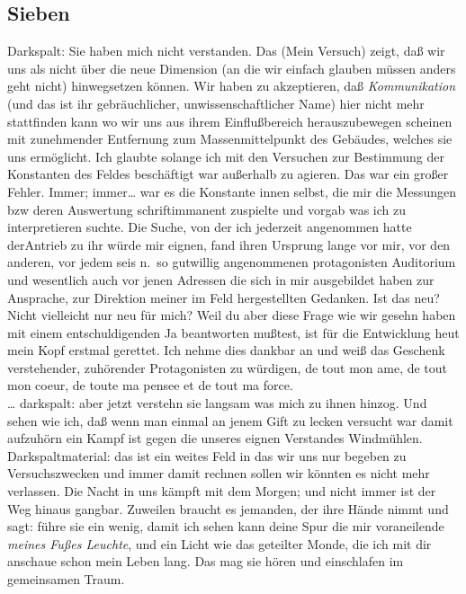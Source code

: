 \documentclass[
]{article}
\author{}
\date{\vspace{-2.5em}}
\begin{document}
\subsection{Sieben}\label{sieben}

Darkspalt: Sie haben mich nicht verstanden. Das (Mein Versuch) zeigt,
daß wir uns als nicht über die neue Dimension (an die wir einfach
glauben müssen anders geht nicht) hinwegsetzen können. Wir haben zu
akzeptieren, daß \emph{Kommunikation} (und das ist ihr gebräuchlicher,
unwissenschaftlicher Name) hier nicht mehr stattfinden kann wo wir uns
aus ihrem Einflußbereich herauszubewegen scheinen mit zunehmender
Entfernung zum Massenmittelpunkt des Gebäudes, welches sie uns
ermöglicht. Ich glaubte solange ich mit den Versuchen zur Bestimmung der
Konstanten des Feldes beschäftigt war außerhalb zu agieren. Das war ein
großer Fehler. Immer; immer\ldots{} war es die Konstante innen selbst,
die mir die Messungen bzw deren Auswertung schriftimmanent zuspielte und
vorgab was ich zu interpretieren suchte. Die Suche, von der ich
jederzeit angenommen hatte derAntrieb zu ihr würde mir eignen, fand
ihren Ursprung lange vor mir, vor den anderen, vor jedem seis n.~so
gutwillig angenommenen protagonisten Auditorium und wesentlich auch vor
jenen Adressen die sich in mir ausgebildet haben zur Ansprache, zur
Direktion meiner im Feld hergestellten Gedanken. Ist das neu? Nicht
vielleicht nur neu für mich? Weil du aber diese Frage wie wir gesehn
haben mit einem entschuldigenden Ja beantworten mußtest, ist für die
Entwicklung heut mein Kopf erstmal gerettet. Ich nehme dies dankbar an
und weiß das Geschenk verstehender, zuhörender Protagonisten zu
würdigen, de tout mon ame, de tout mon coeur, de toute ma pensee et de
tout ma force.\\
\ldots{} darkspalt: aber jetzt verstehn sie langsam was mich zu ihnen
hinzog. Und sehen wie ich, daß wenn man einmal an jenem Gift zu lecken
versucht war damit aufzuhörn ein Kampf ist gegen die unseres eignen
Verstandes Windmühlen. Darkspaltmaterial: das ist ein weites Feld in das
wir uns nur begeben zu Versuchszwecken und immer damit rechnen sollen
wir könnten es nicht mehr verlassen. Die Nacht in uns kämpft mit dem
Morgen; und nicht immer ist der Weg hinaus gangbar. Zuweilen braucht es
jemanden, der ihre Hände nimmt und sagt: führe sie ein wenig, damit ich
sehen kann deine Spur die mir voraneilende \emph{meines Fußes Leuchte},
und ein Licht wie das geteilter Monde, die ich mit dir anschaue schon
mein Leben lang. Das mag sie hören und einschlafen im gemeinsamen Traum.
\end{document}
